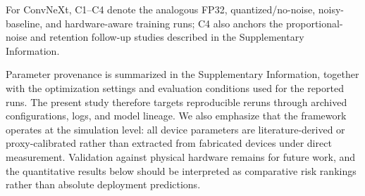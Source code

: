 For ConvNeXt, C1--C4 denote the analogous FP32, quantized/no-noise, noisy-baseline, and hardware-aware training runs; C4 also anchors the proportional-noise and retention follow-up studies described in the Supplementary Information.

Parameter provenance is summarized in the Supplementary Information, together with the optimization settings and evaluation conditions used for the reported runs. The present study therefore targets reproducible reruns through archived configurations, logs, and model lineage. We also emphasize that the framework operates at the simulation level: all device parameters are literature-derived or proxy-calibrated rather than extracted from fabricated devices under direct measurement. Validation against physical hardware remains for future work, and the quantitative results below should be interpreted as comparative risk rankings rather than absolute deployment predictions.
